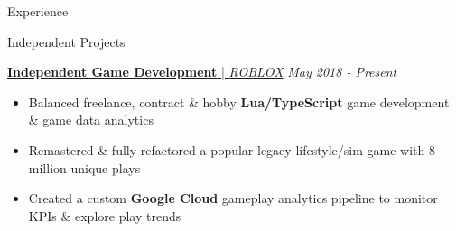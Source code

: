 \documentclass{resume/resume}
\begin{document}
\begin{rSection}{Experience}
  
\end{rSection}

\begin{rSection}{Independent Projects}
  

  \href{https://www.roblox.com/games/849680368/Robloxaville-Next-Generation-BETA}{{\bf Independent Game Development} | {\em ROBLOX}} \hfill {\em May 2018 - Present}
  \vspace{-6pt}
  \begin{itemize}[nosep]
    \item Balanced freelance, contract \& hobby {\bf Lua/TypeScript} game development \& game data analytics
    \item Remastered \& fully refactored a popular legacy lifestyle/sim game with 8 million unique plays
    \item Created a custom {\bf Google Cloud} gameplay analytics pipeline to monitor KPIs \& explore play trends
  \end{itemize}
  

\end{rSection}
\end{document}
